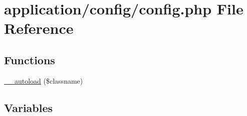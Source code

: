 \hypertarget{application_2config_2config_8php}{\section{application/config/config.php File Reference}
\label{application_2config_2config_8php}
}
\subsection*{Functions}
\begin{DoxyCompactItemize}
\item 
\hyperlink{application_2config_2config_8php_a0be872cd5a9e883ce56599451b1e5e25}{\-\_\-\-\_\-autoload} (\$classname)
\end{DoxyCompactItemize}
\subsection*{Variables}
